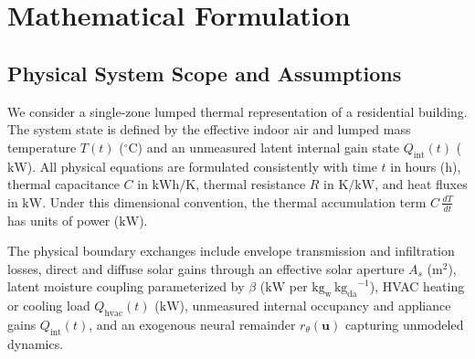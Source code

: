 \documentclass[11pt,letterpaper]{article}
\begin{document}
\section{Mathematical Formulation}
\label{sec:model}

\subsection{Physical System Scope and Assumptions}
\label{sec:model-scope}
We consider a single-zone lumped thermal representation of a residential building. The system state is defined by the effective indoor air and lumped mass temperature $T(t)$ ($^\circ\mathrm{C}$) and an unmeasured latent internal gain state $Q_\mathrm{int}(t)$ ($\mathrm{kW}$). All physical equations are formulated consistently with time $t$ in hours ($\mathrm{h}$), thermal capacitance $C$ in $\mathrm{kWh/K}$, thermal resistance $R$ in $\mathrm{K/kW}$, and heat fluxes in $\mathrm{kW}$. Under this dimensional convention, the thermal accumulation term $C\,\frac{dT}{dt}$ has units of power ($\mathrm{kW}$).

The physical boundary exchanges include envelope transmission and infiltration losses, direct and diffuse solar gains through an effective solar aperture $A_s$ ($\mathrm{m}^2$), latent moisture coupling parameterized by $\beta$ ($\mathrm{kW}$ per $\mathrm{kg_w\,kg_{da}}^{-1}$), HVAC heating or cooling load $Q_\mathrm{hvac}(t)$ ($\mathrm{kW}$), unmeasured internal occupancy and appliance gains $Q_\mathrm{int}(t)$, and an exogenous neural remainder $r_\theta(\bm{u})$ capturing unmodeled dynamics.
\end{document}
